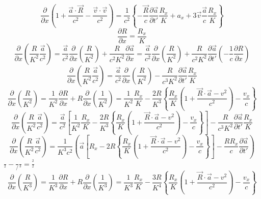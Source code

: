 \documentclass[11pt]{article}
\begin{document}
\[\frac{\partial }{\partial x}\left( 1+\frac{\overrightarrow{a}\cdot \overrightarrow{R}}{{{c}^{2}}}-\frac{\overrightarrow{v}\cdot \overrightarrow{v}}{{{c}^{2}}} \right)=\frac{1}{{{c}^{2}}}\left\{ -\frac{\overrightarrow{R}}{c}\frac{\partial \overrightarrow{a}}{\partial t'}\frac{{{R}_{x}}}{K}+{{a}_{x}}+3\overrightarrow{v}\frac{\overrightarrow{a}}{c}\frac{{{R}_{x}}}{K} \right\}\]
\[\frac{\partial R}{\partial x}=\frac{{{R}_{x}}}{K}\]
\[\frac{\partial }{\partial x}\left( \frac{R}{{{K}^{2}}}\frac{\overrightarrow{a}}{{{c}^{2}}} \right)=\frac{\overrightarrow{a}}{{{c}^{2}}}\frac{\partial }{\partial x}\left( \frac{R}{{{K}^{2}}} \right)+\frac{R}{{{c}^{2}}{{K}^{2}}}\frac{\partial \overrightarrow{a}}{\partial x}=\frac{\overrightarrow{a}}{{{c}^{2}}}\frac{\partial }{\partial x}\left( \frac{R}{{{K}^{2}}} \right)+\frac{R}{{{c}^{2}}{{K}^{2}}}\frac{\partial \overrightarrow{a}}{\partial t'}\left( -\frac{1}{c}\frac{\partial R}{\partial x} \right)\]
\[\frac{\partial }{\partial x}\left( \frac{R}{{{K}^{2}}}\frac{\overrightarrow{a}}{{{c}^{2}}} \right)=\frac{\overrightarrow{a}}{{{c}^{2}}}\frac{\partial }{\partial x}\left( \frac{R}{{{K}^{2}}} \right)-\frac{R}{{{c}^{3}}{{K}^{2}}}\frac{\partial \overrightarrow{a}}{\partial t'}\frac{{{R}_{x}}}{K}\]
\[\frac{\partial }{\partial x}\left( \frac{R}{{{K}^{2}}} \right)=\frac{1}{{{K}^{2}}}\frac{\partial R}{\partial x}+R\frac{\partial }{\partial x}\left( \frac{1}{{{K}^{2}}} \right)=\frac{1}{{{K}^{2}}}\frac{{{R}_{x}}}{K}-\frac{2R}{{{K}^{3}}}\left\{ \frac{{{R}_{x}}}{K}\left( 1+\frac{\overrightarrow{R}\cdot \overrightarrow{a}-{{v}^{2}}}{{{c}^{2}}} \right)-\frac{{{v}_{x}}}{c} \right\}\]
\[\frac{\partial }{\partial x}\left( \frac{R}{{{K}^{2}}}\frac{\overrightarrow{a}}{{{c}^{2}}} \right)=\frac{\overrightarrow{a}}{{{c}^{2}}}\left[ \frac{1}{{{K}^{2}}}\frac{{{R}_{x}}}{K}-\frac{2R}{{{K}^{3}}}\left\{ \frac{{{R}_{x}}}{K}\left( 1+\frac{\overrightarrow{R}\cdot \overrightarrow{a}-{{v}^{2}}}{{{c}^{2}}} \right)-\frac{{{v}_{x}}}{c} \right\} \right]-\frac{R}{{{c}^{3}}{{K}^{2}}}\frac{\partial \overrightarrow{a}}{\partial t'}\frac{{{R}_{x}}}{K}\]
\[\frac{\partial }{\partial x}\left( \frac{R}{{{K}^{2}}}\frac{\overrightarrow{a}}{{{c}^{2}}} \right)=\frac{1}{{{K}^{3}}{{c}^{2}}}\left( \overrightarrow{a}\left[ {{R}_{x}}-2R\left\{ \frac{{{R}_{x}}}{K}\left( 1+\frac{\overrightarrow{R}\cdot \overrightarrow{a}-{{v}^{2}}}{{{c}^{2}}} \right)-\frac{{{v}_{x}}}{c} \right\} \right]-\frac{R{{R}_{x}}}{c}\frac{\partial \overrightarrow{a}}{\partial t'} \right)\]
\(\frac{}{{{}^{2}}}-\frac{}{/}\frac{}{{{}^{3}}}=\frac{{{}^{2}}}{{{}^{2}}}\)
\[\frac{\partial }{\partial x}\left( \frac{R}{{{K}^{3}}} \right)=\frac{1}{{{K}^{3}}}\frac{\partial R}{\partial x}+R\frac{\partial }{\partial x}\left( \frac{1}{{{K}^{3}}} \right)=\frac{1}{{{K}^{3}}}\frac{{{R}_{x}}}{K}-\frac{3R}{{{K}^{4}}}\left\{ \frac{{{R}_{x}}}{K}\left( 1+\frac{\overrightarrow{R}\cdot \overrightarrow{a}-{{v}^{2}}}{{{c}^{2}}} \right)-\frac{{{v}_{x}}}{c} \right\}\]
\end{document}
